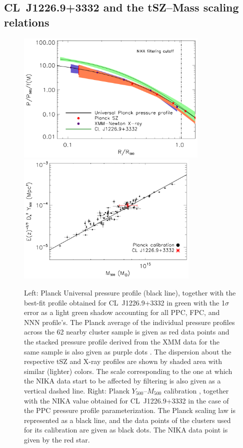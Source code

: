 \documentclass[twocolumn,traditabstract]{aa}
\begin{document}
\subsection{\mbox{CL~J1226.9+3332} and the tSZ--Mass scaling relations}\label{sec:scaling_relation}
	\begin{figure}[h]
	\centering
	\includegraphics[height=6.3cm]{Figure/UniversalPressure.pdf}
	\includegraphics[height=6.3cm]{Figure/Y500M500.pdf}
	\caption{Left: Planck Universal pressure profile (black line), together with the best-fit profile obtained for \mbox{CL~J1226.9+3332} in green with the 1$\sigma$ error as a light green shadow accounting for all PPC, FPC, and NNN profile's. The Planck average of the individual pressure profiles across the 62 nearby cluster sample is given as red data points and the stacked pressure profile derived from the XMM data for the same sample is also given as purple dots \citep{planck2013pressure_profile}. The dispersion about the respective tSZ and \mbox{X-ray} profiles are shown by shaded area with similar (lighter) colors. The scale corresponding to the one at which the NIKA data start to be affected by filtering is also given as a vertical dashed line.
	Right: Planck $Y_{500}$--$M_{500}$ calibration \citep{planck2013cluster_count}, together with the NIKA value obtained for \mbox{CL~J1226.9+3332} in the case of the PPC pressure profile parameterization. The Planck scaling law is represented as a black line, and the data points of the clusters used for its calibration are given as black dots. The NIKA data point is given by the red star.}
        \label{fig:scaling_law}
	\end{figure}
\end{document}
